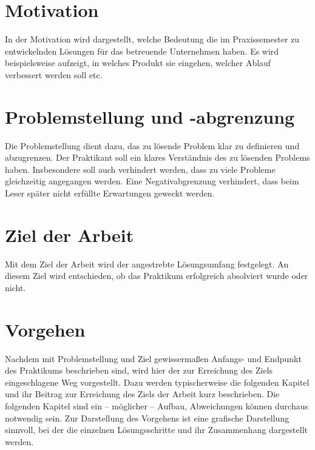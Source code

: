 \documentclass[oneside]{ausarbeitung}
\begin{document}
\section{Motivation}
\label{sec:motivation}

In der Motivation wird dargestellt, welche Bedeutung die im
Praxissemester zu entwickelnden Lösungen für das betreuende Unternehmen
haben. Es wird beispielsweise aufzeigt, in welches Produkt sie eingehen,
welcher Ablauf verbessert werden soll etc.

\section{Problemstellung und -abgrenzung}
\label{sec:problemstellung}

Die Problemstellung dient dazu, das zu lösende Problem klar zu
definieren und abzugrenzen. Der Praktikant soll ein klares Verständnis
des zu lösenden Problems haben. Insbesondere soll auch verhindert
werden, dass zu viele Probleme gleichzeitig angegangen werden. Eine
Negativabgrenzung verhindert, dass beim Leser später nicht erfüllte
Erwartungen geweckt werden.

\section{Ziel der Arbeit}
\label{sec:ziel}

Mit dem Ziel der Arbeit wird der angestrebte Lösungsumfang festgelegt. An diesem Ziel wird entschieden, ob das Praktikum erfolgreich absolviert wurde oder nicht.

\section{Vorgehen}
\label{sec:vorgehen}

Nachdem mit Problemstellung und Ziel gewissermaßen Anfangs- und Endpunkt
des Praktikums beschrieben sind, wird hier der zur Erreichung des Ziels
eingeschlagene Weg vorgestellt. Dazu werden typischerweise die folgenden
Kapitel und ihr Beitrag zur Erreichung des Ziels der Arbeit kurz
beschrieben. Die folgenden Kapitel sind ein – möglicher – Aufbau,
Abweichungen können durchaus notwendig sein. Zur Darstellung des
Vorgehens ist eine grafische Darstellung sinnvoll, bei der die einzelnen
Lösungsschritte und ihr Zusammenhang dargestellt werden.

\end{document}
